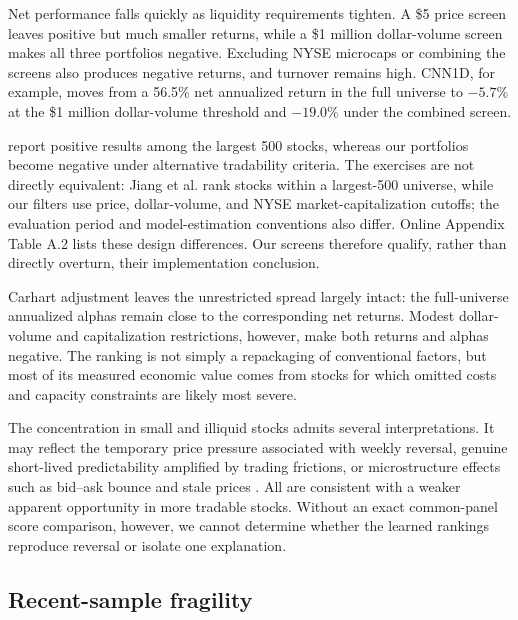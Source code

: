 \FloatBarrier

Net performance falls quickly as liquidity requirements tighten. A \$5 price screen leaves positive but much smaller returns, while a \$1 million dollar-volume screen makes all three portfolios negative. Excluding NYSE microcaps or combining the screens also produces negative returns, and turnover remains high. CNN1D, for example, moves from a 56.5\% net annualized return in the full universe to $-5.7\%$ at the \$1 million dollar-volume threshold and $-19.0\%$ under the combined screen.

\Textcite{reimagining_price_trends_jiang} report positive results among the largest 500 stocks, whereas our portfolios become negative under alternative tradability criteria. The exercises are not directly equivalent: Jiang et al. rank stocks within a largest-500 universe, while our filters use price, dollar-volume, and NYSE market-capitalization cutoffs; the evaluation period and model-estimation conventions also differ. Online Appendix Table A.2 lists these design differences. Our screens therefore qualify, rather than directly overturn, their implementation conclusion.

Carhart adjustment leaves the unrestricted spread largely intact: the full-universe annualized alphas remain close to the corresponding net returns. Modest dollar-volume and capitalization restrictions, however, make both returns and alphas negative. The ranking is not simply a repackaging of conventional factors, but most of its measured economic value comes from stocks for which omitted costs and capacity constraints are likely most severe.

The concentration in small and illiquid stocks admits several interpretations. It may reflect the temporary price pressure associated with weekly reversal, genuine short-lived predictability amplified by trading frictions, or microstructure effects such as bid--ask bounce and stale prices \parencite{jegadeeshEvidencePredictableBehavior1990,lehmannFadsMartingalesMarket1990,chenMaxingOutReversals2025}. All are consistent with a weaker apparent opportunity in more tradable stocks. Without an exact common-panel score comparison, however, we cannot determine whether the learned rankings reproduce reversal or isolate one explanation.

\subsection{Recent-sample fragility}\label{subsec:sample_stability}

